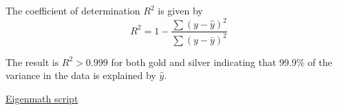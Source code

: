 The coefficient of determination $R^2$ is given by
\begin{equation*}
R^2=1-\frac{\sum(y-\hat y)^2}{\sum(y-\bar y)^2}
\end{equation*}

The result is $R^2>0.999$ for both gold and silver indicating
that 99.9\% of the variance in the data is explained by $\hat y$.

\bigskip
\href{https://georgeweigt.github.io/examples/geiger-and-marsden-scattering-data-demo.html}{Eigenmath script}


